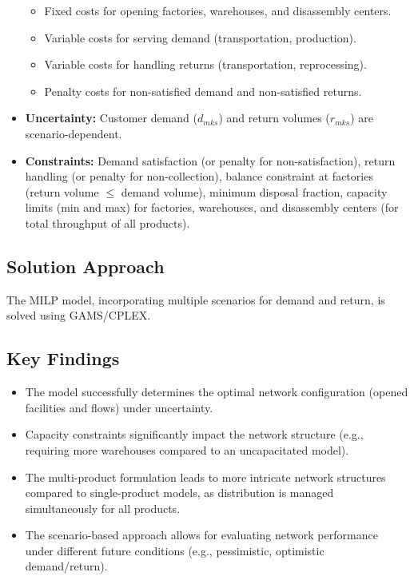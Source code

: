 \begin{itemize}
        \begin{itemize}
            \item Fixed costs for opening factories, warehouses, and disassembly centers.
            \item Variable costs for serving demand (transportation, production).
            \item Variable costs for handling returns (transportation, reprocessing).
            \item Penalty costs for non-satisfied demand and non-satisfied returns.
        \end{itemize}
    \item \textbf{Uncertainty:} Customer demand ($d_{mks}$) and return volumes ($r_{mks}$) are scenario-dependent.
    \item \textbf{Constraints:} Demand satisfaction (or penalty for non-satisfaction), return handling (or penalty for non-collection), balance constraint at factories (return volume $\le$ demand volume), minimum disposal fraction, capacity limits (min and max) for factories, warehouses, and disassembly centers (for total throughput of all products).
\end{itemize}

\subsection*{Solution Approach}
The MILP model, incorporating multiple scenarios for demand and return, is solved using GAMS/CPLEX.

\subsection*{Key Findings}
\begin{itemize}
    \item The model successfully determines the optimal network configuration (opened facilities and flows) under uncertainty.
    \item Capacity constraints significantly impact the network structure (e.g., requiring more warehouses compared to an uncapacitated model).
    \item The multi-product formulation leads to more intricate network structures compared to single-product models, as distribution is managed simultaneously for all products.
    \item The scenario-based approach allows for evaluating network performance under different future conditions (e.g., pessimistic, optimistic demand/return).
\end{itemize}

